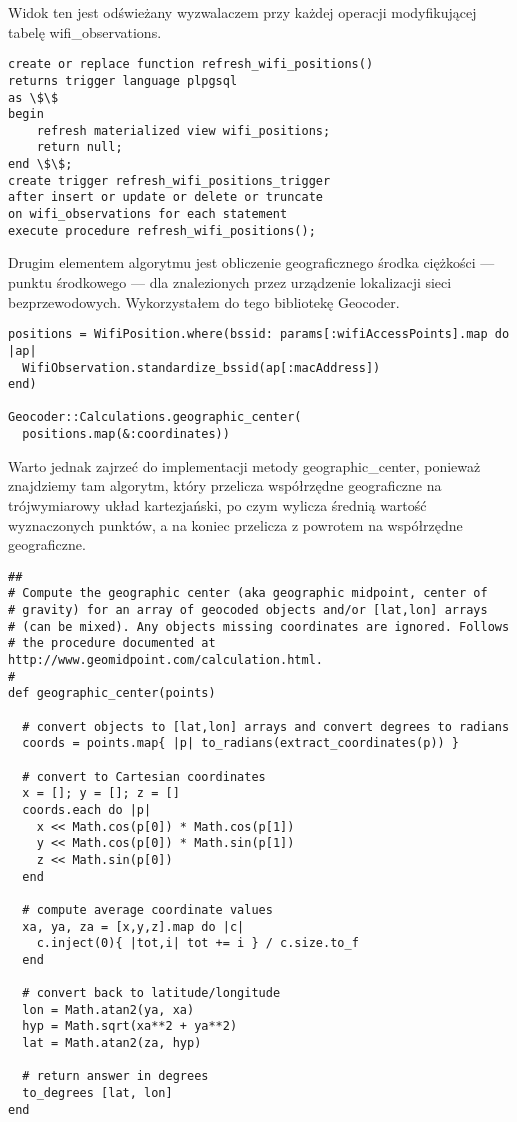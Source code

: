 Widok ten jest odświeżany wyzwalaczem przy każdej operacji modyfikującej tabelę wifi\_observations.

\begin{verbatim}
create or replace function refresh_wifi_positions()
returns trigger language plpgsql
as \$\$
begin
    refresh materialized view wifi_positions;
    return null;
end \$\$;
create trigger refresh_wifi_positions_trigger
after insert or update or delete or truncate
on wifi_observations for each statement
execute procedure refresh_wifi_positions();
\end{verbatim}

Drugim elementem algorytmu jest obliczenie geograficznego środka ciężkości — punktu środkowego — dla znalezionych przez urządzenie lokalizacji sieci bezprzewodowych. Wykorzystałem do tego bibliotekę Geocoder.

\begin{verbatim}
positions = WifiPosition.where(bssid: params[:wifiAccessPoints].map do |ap|
  WifiObservation.standardize_bssid(ap[:macAddress])
end)

Geocoder::Calculations.geographic_center(
  positions.map(&:coordinates))
\end{verbatim}

Warto jednak zajrzeć do implementacji metody geographic\_center, ponieważ znajdziemy tam algorytm, który przelicza współrzędne geograficzne na trójwymiarowy układ kartezjański, po czym wylicza średnią wartość wyznaczonych punktów, a na koniec przelicza z powrotem na współrzędne geograficzne.

\begin{verbatim}
##
# Compute the geographic center (aka geographic midpoint, center of
# gravity) for an array of geocoded objects and/or [lat,lon] arrays
# (can be mixed). Any objects missing coordinates are ignored. Follows
# the procedure documented at http://www.geomidpoint.com/calculation.html.
#
def geographic_center(points)

  # convert objects to [lat,lon] arrays and convert degrees to radians
  coords = points.map{ |p| to_radians(extract_coordinates(p)) }

  # convert to Cartesian coordinates
  x = []; y = []; z = []
  coords.each do |p|
    x << Math.cos(p[0]) * Math.cos(p[1])
    y << Math.cos(p[0]) * Math.sin(p[1])
    z << Math.sin(p[0])
  end

  # compute average coordinate values
  xa, ya, za = [x,y,z].map do |c|
    c.inject(0){ |tot,i| tot += i } / c.size.to_f
  end

  # convert back to latitude/longitude
  lon = Math.atan2(ya, xa)
  hyp = Math.sqrt(xa**2 + ya**2)
  lat = Math.atan2(za, hyp)

  # return answer in degrees
  to_degrees [lat, lon]
end
\end{verbatim}

